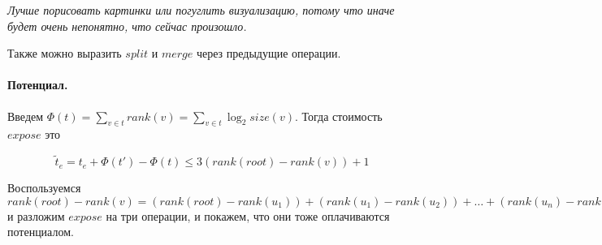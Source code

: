 \documentclass[12pt]{article}
\begin{document}
\textit{Лучше порисовать картинки или погуглить визуализацию, потому что иначе будет очень непонятно, что сейчас произошло.}

Также можно выразить $split$ и $merge$ через предыдущие операции.

\paragraph{Потенциал.} Введем $\Phi(t) = \displaystyle \sum_{v \in t} rank(v) = \displaystyle \sum_{v \in t} \log_2 {size(v)}$. Тогда стоимость $expose$ это 

$$\tilde t_e = t_e + \Phi(t') - \Phi(t) \le 3(rank(root) - rank(v)) + 1$$

Воспользуемся $rank(root) - rank(v) = (rank(root) - rank(u_1)) + (rank(u_1) - rank(u_2)) + \dots + (rank(u_n) - rank(v))$ и разложим $expose$ на три операции, и покажем, что они тоже оплачиваются потенциалом.
\end{document}
